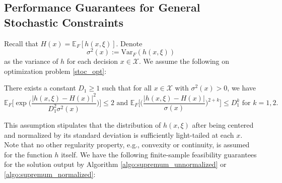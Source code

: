 \documentclass[mnsc,blindrev]{informs4} %
\begin{document}
\subsection{Performance Guarantees for General Stochastic Constraints}
Recall that $H(x)=\mathbb E_F[h(x,\xi)]$. Denote $$\sigma^2(x):=\mathrm{Var}_F(h(x,\xi))$$
as the variance of $h$ for each decision $x\in\mathcal X$. We assume the following on optimization problem \eqref{stoc_opt}:
\begin{assumption}\label{sub-gaussian bound}
There exists a constant $D_1\geq 1$ such that for all $x\in\mathcal X$ with $\sigma^2(x)>0$, we have
\begin{equation*}
\mathbb E_F\Big[\exp\Big(\frac{\lvert h(x,\xi)-H(x)\rvert^2}{D_1^2\sigma^2(x)}\Big)\Big]\leq 2\text{\ \ and\ \ }\mathbb E_F\Big[\Big(\frac{\lvert h(x,\xi)-H(x)\rvert}{\sigma(x)}\Big)^{2+k}\Big]\leq D_1^k\text{ for }k=1,2.
\end{equation*}
\end{assumption}
This assumption stipulates that the distribution of $h(x,\xi)$ after being centered and normalized by its standard deviation is sufficiently light-tailed at each $x$. Note that no other regularity property, e.g., convexity or continuity, is assumed for the function $h$ itself. We have the following finite-sample feasibility guarantees for the solution output by Algorithm \ref{algo:supremum_unnormalized} or \ref{algo:supremum_normalized}:
\end{document}
